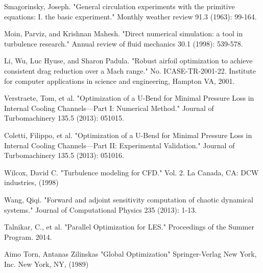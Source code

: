 \documentclass[a4paper,onecolumn]{article}
\theoremstyle{remark}
\begin{document}
\begin{thebibliography}{9}
Smagorinsky, Joseph. 
"General circulation experiments with the primitive equations: I. the basic experiment." 
Monthly weather review 91.3 (1963): 99-164.

Moin, Parviz, and Krishnan Mahesh. 
"Direct numerical simulation: a tool in turbulence research." 
Annual review of fluid mechanics 30.1 (1998): 539-578.

Li, Wu, Luc Hyuse, and Sharon Padula. 
"Robust airfoil optimization to achieve consistent drag reduction over a Mach range."
No. ICASE-TR-2001-22. 
Institute for computer applications in science and engineering, Hampton VA, 2001.

Verstraete, Tom, et al. 
"Optimization of a U-Bend for Minimal Pressure Loss in Internal Cooling Channels—Part I: Numerical Method." 
Journal of Turbomachinery 135.5 (2013): 051015.

Coletti, Filippo, et al. 
"Optimization of a U-Bend for Minimal Pressure Loss in Internal Cooling Channels—Part II: Experimental Validation." 
Journal of Turbomachinery 135.5 (2013): 051016.

Wilcox, David C. 
"Turbulence modeling for CFD." 
Vol. 2. La Canada, CA: DCW industries, (1998)

Wang, Qiqi. 
"Forward and adjoint sensitivity computation of chaotic dynamical systems." 
Journal of Computational Physics 235 (2013): 1-13.

Talnikar, C., et al. "Parallel Optimization for LES." Proceedings of the Summer Program. 2014.

Aimo Torn, Antanas Zilinskas
"Global Optimization"
Springer-Verlag New York, Inc. New York, NY, (1989)


\end{thebibliography}
\end{document}
